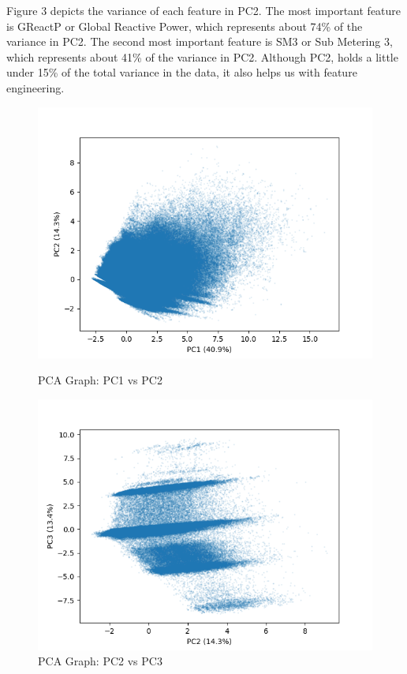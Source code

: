 \documentclass[11pt]{article}
\begin{document}
Figure 3 depicts the variance of each feature in PC2.
The most important feature is GReactP or Global Reactive Power, which represents
about 74\% of the variance in PC2.
The second most important feature is SM3 or Sub Metering 3, which represents
about 41\% of the variance in PC2.
Although PC2, holds a little under 15\% of the total variance in the data, it also
helps us with feature engineering. 

\begin{figure}[H]
  \begin{minipage}{0.499\textwidth}
    \centering
    \includegraphics[width=\textwidth, trim=0 0 30 40, clip]{../images/PC1_PC2.png}
    \caption{PCA Graph: PC1 vs PC2}
  \end{minipage}\hfill
  \begin{minipage}{0.499\textwidth}
    \centering
    \includegraphics[width=\textwidth, trim=0 0 30 40, clip]{../images/PC2_PC3.png}
    \caption{PCA Graph: PC2 vs PC3}
  \end{minipage}
\end{figure}
\end{document}
